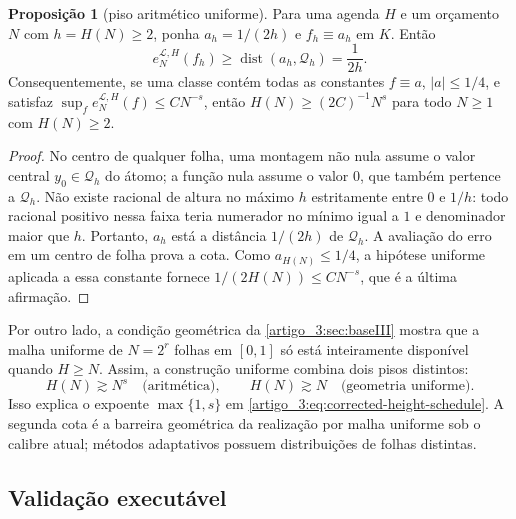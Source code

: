 \documentclass[12pt,a4paper]{article}
\theoremstyle{preciso}
\theoremstyle{definition}
\newcommand{\Library}{\mathcal{L}}
\theoremstyle{preciso}
\theoremstyle{preciso}
\theoremstyle{preciso}
\newtheorem{proposition}[teorema]{Proposição}
\theoremstyle{preciso}
\theoremstyle{definition}
\theoremstyle{preciso}
\theoremstyle{definition}
\theoremstyle{preciso}
\theoremstyle{preciso}
\theoremstyle{definition}
\begin{document}
\begin{proposition}[piso aritmético uniforme]\label{map:artigo_3:4.6}
\label{artigo_3:prop:arithmetic-floor}
Para uma agenda $H$ e um orçamento $N$ com $h=H(N)\ge2$,
ponha $a_h=1/(2h)$ e $f_h\equiv a_h$ em $K$. Então
\begin{equation}
 e_N^{\Library,H}(f_h)
 \ge\operatorname{dist}(a_h,\mathcal Q_h)
 =\frac1{2h}.
 \label{artigo_3:eq:arithmetic-floor}
\end{equation}
Consequentemente, se uma classe contém todas as constantes
$f\equiv a$, $|a|\le1/4$, e satisfaz
$\sup_f e_N^{\Library,H}(f)\le C N^{-s}$, então
$H(N)\ge(2C)^{-1}N^s$ para todo $N\ge1$ com $H(N)\ge2$.
\end{proposition}

\begin{proof}
No centro de qualquer folha, uma montagem não nula assume o valor central
$y_0\in\mathcal Q_h$ do átomo; a função nula assume o valor $0$, que também
pertence a $\mathcal Q_h$. Não existe racional de altura no máximo $h$
estritamente entre $0$ e $1/h$: todo racional positivo nessa faixa teria
numerador no mínimo igual a $1$ e denominador maior que $h$. Portanto,
$a_h$ está a distância $1/(2h)$ de $\mathcal Q_h$. A avaliação do erro em um
centro de folha prova a cota. Como $a_{H(N)}\le1/4$, a hipótese uniforme
aplicada a essa constante fornece
$1/(2H(N))\le CN^{-s}$, que é a última afirmação.
\end{proof}

Por outro lado, a condição geométrica da \cref{artigo_3:sec:baseIII} mostra que a malha
uniforme de $N=2^r$ folhas em $[0,1]$ só está inteiramente disponível quando
$H\ge N$. Assim, a construção uniforme combina dois pisos distintos:
\begin{equation}
 H(N)\gtrsim N^s\quad\text{(aritmética)},
 \qquad
 H(N)\gtrsim N\quad\text{(geometria uniforme)}.
 \label{artigo_3:eq:two-height-floors}
\end{equation}
Isso explica o expoente $\max\{1,s\}$ em
\eqref{artigo_3:eq:corrected-height-schedule}. A segunda cota é a barreira geométrica
da realização por malha uniforme sob o calibre atual; métodos adaptativos
possuem distribuições de folhas distintas.

\subsection{Validação executável}
\end{document}
